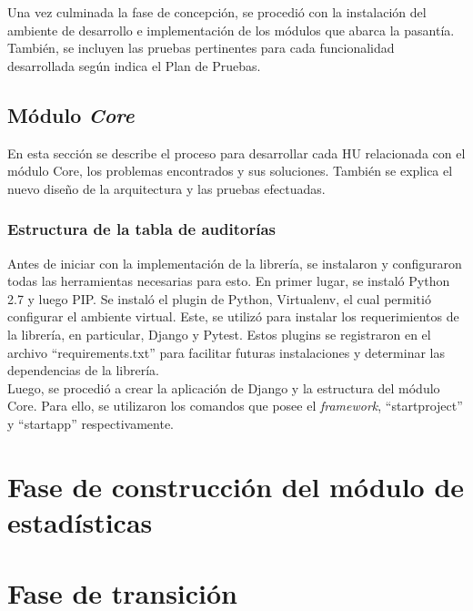 Una vez culminada la fase de concepción, se procedió con la instalación del ambiente de desarrollo e implementación de los módulos que abarca la pasantía. También, se incluyen las pruebas pertinentes para cada funcionalidad desarrollada según indica el Plan de Pruebas.

\subsection{Módulo \textit{Core}}

En esta sección se describe el proceso para desarrollar cada HU relacionada con el módulo Core, los problemas encontrados y sus soluciones. También se explica el nuevo diseño de la arquitectura y las pruebas efectuadas.

\subsubsection{Estructura de la tabla de auditorías}

Antes de iniciar con la implementación de la librería, se instalaron y configuraron todas las herramientas necesarias para esto. En primer lugar, se instaló Python 2.7 y luego PIP. Se instaló el plugin de Python, Virtualenv, el cual permitió configurar el ambiente virtual. Este, se utilizó para instalar los requerimientos de la librería, en particular, Django y Pytest. Estos plugins se registraron en el archivo “requirements.txt” para facilitar futuras instalaciones y determinar las dependencias de la librería.\\

Luego, se procedió a crear la aplicación de Django y la estructura del módulo Core. Para ello, se utilizaron los comandos que posee el \textit{framework}, “startproject” y “startapp” respectivamente.

\section{Fase de construcción del módulo de estadísticas}
\section{Fase de transición}
